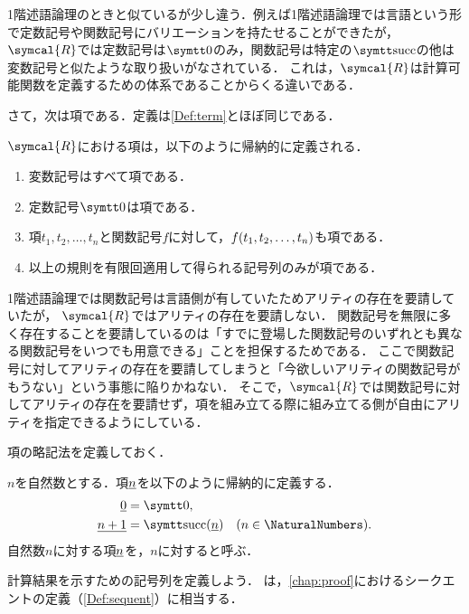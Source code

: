 1階述語論理のときと似ているが少し違う．例えば1階述語論理では言語という形で定数記号や関数記号にバリエーションを持たせることができたが，
\(\symcal{R}\)では定数記号は\(\obj{0}\)のみ，関数記号は特定の\(\obj{\succfunc}\)の他は変数記号と似たような取り扱いがなされている．
これは，\(\symcal{R}\)は計算可能関数を定義するための体系であることからくる違いである．

さて，次は項である．定義は\cref{Def:term}とほぼ同じである．

\begin{Def} \label{Def:computablefunctionterm}
	\(\symcal{R}\)における項は，以下のように帰納的に定義される．
	\begin{enumerate}
		\item 変数記号はすべて項である．
		\item 定数記号\(\obj{0}\)は項である．
		\item 項\(t_1, t_2, \dotsc, t_n\)と関数記号\(f\)に対して，\(\apply{f}{t_1, t_2, \dots, t_n}\)も項である．
		\item 以上の規則を有限回適用して得られる記号列のみが項である．
	\end{enumerate}
\end{Def}

1階述語論理では関数記号は言語側が有していたためアリティの存在を要請していたが，
\(\symcal{R}\)ではアリティの存在を要請しない．
関数記号を無限に多く存在することを要請しているのは「すでに登場した関数記号のいずれとも異なる関数記号をいつでも用意できる」ことを担保するためである．
ここで関数記号に対してアリティの存在を要請してしまうと「今欲しいアリティの関数記号がもうない」という事態に陥りかねない．
そこで，\(\symcal{R}\)では関数記号に対してアリティの存在を要請せず，項を組み立てる際に組み立てる側が自由にアリティを指定できるようにしている．

項の略記法を定義しておく．

\begin{Def} \label{Def:computablefunctionnumeral}
	\(n\)を自然数とする．項\(\underline{n}\)を以下のように帰納的に定義する．
	\begin{align}
		\numeral{0}     & = \obj{0},                                                                       \\
		\numeral{n + 1} & = \apply{\obj{\succfunc}}{\numeral{n}} \quad \text{(\(n \in \NaturalNumbers\))}.
	\end{align}
	自然数\(n\)に対する項\(\underline{n}\)を，\(n\)に対すると呼ぶ．
\end{Def}

計算結果を示すための記号列を定義しよう．
は，\cref{chap:proof}におけるシークエントの定義（\cref{Def:sequent}）に相当する．

